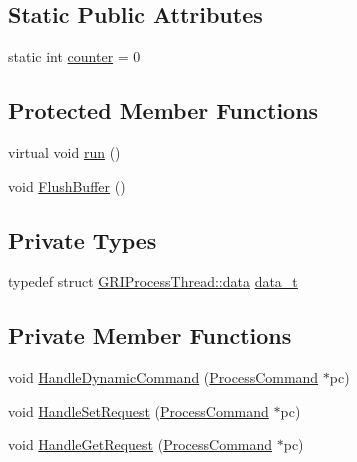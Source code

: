 \subsection*{\-Static \-Public \-Attributes}
\begin{DoxyCompactItemize}
\item 
static int \hyperlink{classGRIProcessThread_acb373c365624696034eeb9f9662b56d1}{counter} = 0
\end{DoxyCompactItemize}
\subsection*{\-Protected \-Member \-Functions}
\begin{DoxyCompactItemize}
\item 
virtual void \hyperlink{classGRIProcessThread_a0d70fb6923169f4001330b47202189a3}{run} ()
\item 
void \hyperlink{classGRIProcessThread_a007fbf43e0faf98916595e2f1d04d615}{\-Flush\-Buffer} ()
\end{DoxyCompactItemize}
\subsection*{\-Private \-Types}
\begin{DoxyCompactItemize}
\item 
typedef struct \*
\hyperlink{structGRIProcessThread_1_1data}{\-G\-R\-I\-Process\-Thread\-::data} \hyperlink{classGRIProcessThread_a423f1f4b8f6c94ae5ac6707433bc8e07}{data\-\_\-t}
\end{DoxyCompactItemize}
\subsection*{\-Private \-Member \-Functions}
\begin{DoxyCompactItemize}
\item 
void \hyperlink{classGRIProcessThread_aae5947ed8aa3493f361003655de94b1f}{\-Handle\-Dynamic\-Command} (\hyperlink{structProcessCommand}{\-Process\-Command} $\ast$pc)
\item 
void \hyperlink{classGRIProcessThread_a375881fa5596dd79b58f34a9b987e889}{\-Handle\-Set\-Request} (\hyperlink{structProcessCommand}{\-Process\-Command} $\ast$pc)
\item 
void \hyperlink{classGRIProcessThread_a0fe71e6fc0d6c1a40329ed9c959a4b8f}{\-Handle\-Get\-Request} (\hyperlink{structProcessCommand}{\-Process\-Command} $\ast$pc)
\end{DoxyCompactItemize}
